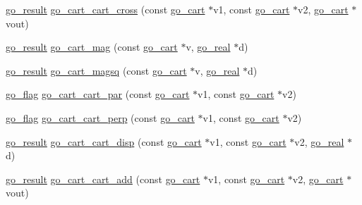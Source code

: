 \begin{DoxyCompactItemize}
\item 
\hyperlink{gotypes_8h_a55d48b38cd959f63c7e8db8337a9792a}{go\-\_\-result} \hyperlink{namespacegomotion_af03c22a87699451903458ebab6fa9027}{go\-\_\-cart\-\_\-cart\-\_\-cross} (const \hyperlink{structgomotion_1_1go__cart}{go\-\_\-cart} $\ast$v1, const \hyperlink{structgomotion_1_1go__cart}{go\-\_\-cart} $\ast$v2, \hyperlink{structgomotion_1_1go__cart}{go\-\_\-cart} $\ast$vout)
\item 
\hyperlink{gotypes_8h_a55d48b38cd959f63c7e8db8337a9792a}{go\-\_\-result} \hyperlink{namespacegomotion_a03050d33c64c2a687e282ceb53645235}{go\-\_\-cart\-\_\-mag} (const \hyperlink{structgomotion_1_1go__cart}{go\-\_\-cart} $\ast$v, \hyperlink{gotypes_8h_afd666a2393eebd71ee455846ac9def9b}{go\-\_\-real} $\ast$d)
\item 
\hyperlink{gotypes_8h_a55d48b38cd959f63c7e8db8337a9792a}{go\-\_\-result} \hyperlink{namespacegomotion_aa1876c9e617115a9c17664697606f907}{go\-\_\-cart\-\_\-magsq} (const \hyperlink{structgomotion_1_1go__cart}{go\-\_\-cart} $\ast$v, \hyperlink{gotypes_8h_afd666a2393eebd71ee455846ac9def9b}{go\-\_\-real} $\ast$d)
\item 
\hyperlink{gotypes_8h_ae890d9a0ddecc0d3073622cc4312092d}{go\-\_\-flag} \hyperlink{namespacegomotion_a4d4b8ab00527c875ca629e6d14b3d94b}{go\-\_\-cart\-\_\-cart\-\_\-par} (const \hyperlink{structgomotion_1_1go__cart}{go\-\_\-cart} $\ast$v1, const \hyperlink{structgomotion_1_1go__cart}{go\-\_\-cart} $\ast$v2)
\item 
\hyperlink{gotypes_8h_ae890d9a0ddecc0d3073622cc4312092d}{go\-\_\-flag} \hyperlink{namespacegomotion_a6b5b67f7dd77ae8de4b73793b8a12ebb}{go\-\_\-cart\-\_\-cart\-\_\-perp} (const \hyperlink{structgomotion_1_1go__cart}{go\-\_\-cart} $\ast$v1, const \hyperlink{structgomotion_1_1go__cart}{go\-\_\-cart} $\ast$v2)
\item 
\hyperlink{gotypes_8h_a55d48b38cd959f63c7e8db8337a9792a}{go\-\_\-result} \hyperlink{namespacegomotion_a2530a89b71ef809648025aff2374021d}{go\-\_\-cart\-\_\-cart\-\_\-disp} (const \hyperlink{structgomotion_1_1go__cart}{go\-\_\-cart} $\ast$v1, const \hyperlink{structgomotion_1_1go__cart}{go\-\_\-cart} $\ast$v2, \hyperlink{gotypes_8h_afd666a2393eebd71ee455846ac9def9b}{go\-\_\-real} $\ast$d)
\item 
\hyperlink{gotypes_8h_a55d48b38cd959f63c7e8db8337a9792a}{go\-\_\-result} \hyperlink{namespacegomotion_a52109f281a73888cae9a5c91b192d06d}{go\-\_\-cart\-\_\-cart\-\_\-add} (const \hyperlink{structgomotion_1_1go__cart}{go\-\_\-cart} $\ast$v1, const \hyperlink{structgomotion_1_1go__cart}{go\-\_\-cart} $\ast$v2, \hyperlink{structgomotion_1_1go__cart}{go\-\_\-cart} $\ast$vout)

\end{DoxyCompactItemize}
